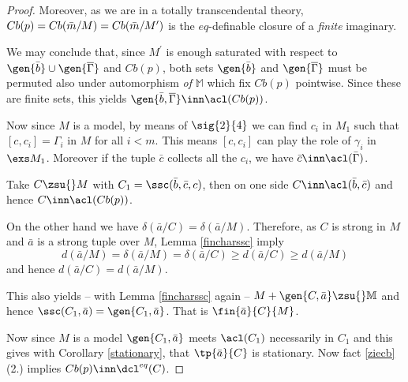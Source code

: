 \documentclass[11pt,english]{article}
\begin{document}
\begin{proof}
Moreover, as we are in a totally transcendental theory, $Cb(p)=Cb(\bar m/M)\\
=Cb(\bar m/M^{\prime})$ is
the $eq$-definable closure of a {\em finite} imaginary.

We may conclude that, since $M^{\prime}$ is enough saturated with respect to $\gen{\bar b}\cup\gen{\overline{\Gamma}}$ and $Cb(p)$,
both sets $\gen{\bar b}$ and $\gen{\overline{\Gamma}}$ must be permuted also under automorphism {\em of} $\mathbb{M}$ which
fix $Cb(p)$ pointwise. Since these are finite sets, this yields $\gen{\bar b, %
\overline{\Gamma}}\inn\acl(Cb(p))$.
\cbend


\medskip


Now since $M$ is a model, by means of $\sig{2}{4}$ we can find $c_{i}$ in $M_{1}$ such that
$[c,c_{i}]=\Gamma_{i}$ in $M$ for all $i<m$. This means $[c,c_{i}]$ can play the role of $\gamma_{i}$ in $\exs M_{1}$.
Moreover if the tuple $\bar c$ collects all the $c_{i}$, %
we have $\bar c\inn\acl(%
\bar\Gamma)$. %

Take $C\zsu{}M$ with $C_{1}=\ssc(\bar b,\bar c,c)$,
then on one side $C\inn\acl(\bar b,\bar c)$ and hence $C\inn\acl(Cb(p))$.

\medskip
On the other hand we have $\delta(\bar a/C)=\delta(\bar a/M)$. %
Therefore, as $C$ is strong in $M$ and $\bar a$ is a strong tuple over $M$, Lemma \ref{fincharssc} imply
$$
d(\bar a/M)=\delta(\bar a/M)=\delta(\bar a/C)\geq d(\bar a/C)\geq d(\bar a/M)
$$
and hence $d(\bar a/C)=d(\bar a/M)$.

This also yields -- with Lemma \ref{fincharssc} again --  $M+\gen{C,\bar a}\zsu{}\mathbb{M}$ and hence $\ssc(C_{1},\bar a)=\gen{C_{1},\bar a}$. That is $\fin{\bar a}{C}{M}$.

\medskip
Now since $M$ is a model $\gen{C_{1},\bar a}$ meets
$\acl(C_{1})$ necessarily in $C_{1}$ and this gives with Corollary \ref{stationary}, that $\tp{\bar a}{C}$
is stationary. Now fact \ref{ziecb}\,(2.) implies $Cb(p)\inn\dcl^{eq}(C)$.


\end{proof}
\end{document}

